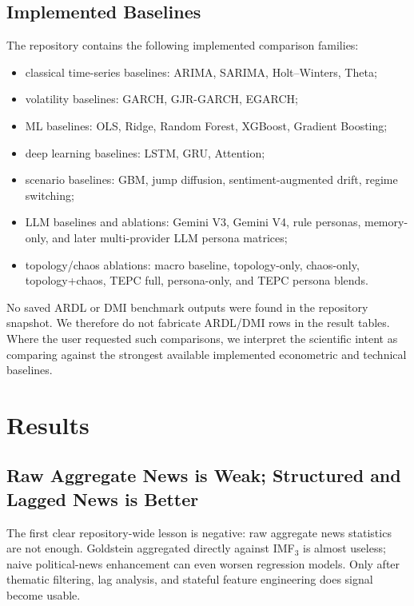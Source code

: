 \documentclass[11pt,a4paper]{article}
\begin{document}
\subsection{Implemented Baselines}

The repository contains the following implemented comparison families:
\begin{itemize}[leftmargin=*]
    \item classical time-series baselines: ARIMA, SARIMA, Holt--Winters, Theta;
    \item volatility baselines: GARCH, GJR-GARCH, EGARCH;
    \item ML baselines: OLS, Ridge, Random Forest, XGBoost, Gradient Boosting;
    \item deep learning baselines: LSTM, GRU, Attention;
    \item scenario baselines: GBM, jump diffusion, sentiment-augmented drift, regime switching;
    \item LLM baselines and ablations: Gemini V3, Gemini V4, rule personas, memory-only, and later multi-provider LLM persona matrices;
    \item topology/chaos ablations: macro baseline, topology-only, chaos-only, topology+chaos, TEPC full, persona-only, and TEPC persona blends.
\end{itemize}

No saved ARDL or DMI benchmark outputs were found in the repository snapshot. We therefore do not fabricate ARDL/DMI rows in the result tables. Where the user requested such comparisons, we interpret the scientific intent as comparing against the strongest available implemented econometric and technical baselines.

\section{Results}

\subsection{Raw Aggregate News is Weak; Structured and Lagged News is Better}

The first clear repository-wide lesson is negative: raw aggregate news statistics are not enough. Goldstein aggregated directly against IMF$_3$ is almost useless; naive political-news enhancement can even worsen regression models. Only after thematic filtering, lag analysis, and stateful feature engineering does signal become usable.
\end{document}

